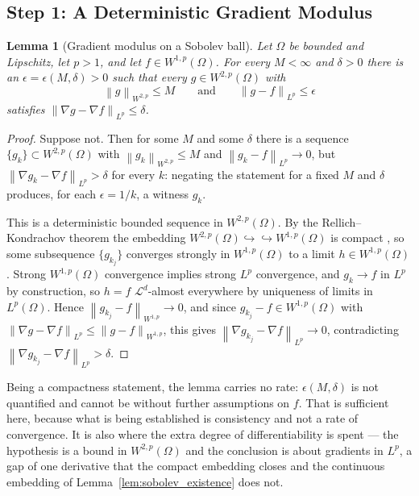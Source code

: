\documentclass[12pt,a4paper]{article}
\numberwithin{equation}{section}
\theoremstyle{plain}
\newtheorem{lemma}{Lemma}
\theoremstyle{definition}
\newcommand{\norm}[1]{\left\| #1 \right\|}
\newcommand{\Wonep}{W^{1,p}(\Omega)}
\newcommand{\Wtwop}{W^{2,p}(\Omega)}
\begin{document}
	\subsection{Step 1: A Deterministic Gradient Modulus}

	\begin{lemma}[Gradient modulus on a Sobolev ball]
		\label{lem:sobolev_modulus}
		Let $\Omega$ be bounded and Lipschitz, let $p > 1$, and let
		$f \in \Wonep$. For every $M < \infty$ and $\delta > 0$ there is an
		$\epsilon = \epsilon(M,\delta) > 0$ such that every $g \in \Wtwop$ with
		\begin{equation}
			\norm{g}_{W^{2,p}} \leq M
			\qquad\text{and}\qquad
			\norm{g - f}_{L^p} \leq \epsilon
		\end{equation}
		satisfies $\norm{\nabla g - \nabla f}_{L^p} \leq \delta$.
	\end{lemma}

	\begin{proof}
		Suppose not. Then for some $M$ and some $\delta$ there is a sequence
		$\{g_k\} \subset \Wtwop$ with $\norm{g_k}_{W^{2,p}} \leq M$ and
		$\norm{g_k - f}_{L^p} \to 0$, but
		$\norm{\nabla g_k - \nabla f}_{L^p} > \delta$ for every $k$: negating the
		statement for a fixed $M$ and $\delta$ produces, for each
		$\epsilon = 1/k$, a witness $g_k$.

		This is a deterministic bounded sequence in $\Wtwop$. By the
		Rellich--Kondrachov theorem the embedding
		$W^{2,p}(\Omega) \hookrightarrow\hookrightarrow W^{1,p}(\Omega)$ is
		compact \citep[Theorem~5,~Section~5.7]{evans2010pde}, so some
		subsequence $\{g_{k_j}\}$ converges strongly in $\Wonep$ to a limit
		$h \in \Wonep$. Strong $\Wonep$ convergence implies strong $L^p$
		convergence, and $g_k \to f$ in $L^p$ by construction, so $h = f$
		$\mathcal{L}^d$-almost everywhere by uniqueness of limits in
		$L^p(\Omega)$. Hence $\norm{g_{k_j} - f}_{W^{1,p}} \to 0$, and since
		$g_{k_j} - f \in \Wonep$ with
		$\norm{\nabla g - \nabla f}_{L^p} \leq \norm{g - f}_{W^{1,p}}$, this
		gives $\norm{\nabla g_{k_j} - \nabla f}_{L^p} \to 0$, contradicting
		$\norm{\nabla g_{k_j} - \nabla f}_{L^p} > \delta$.
	\end{proof}

	Being a compactness statement, the lemma carries no rate: $\epsilon(M,\delta)$
	is not quantified and cannot be without further assumptions on $f$. That is
	sufficient here, because what is being established is consistency and not a
	rate of convergence. It is also where the extra degree of differentiability
	is spent --- the hypothesis is a bound in $\Wtwop$ and the conclusion is
	about gradients in $L^p$, a gap of one derivative that the compact embedding
	closes and the continuous embedding of Lemma~\ref{lem:sobolev_existence}
	does not.
\end{document}

